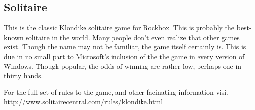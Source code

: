 \subsection{Solitaire}

This is the classic Klondike solitaire game for Rockbox.
This is probably the best-known solitaire in the world. Many people 
don't even realize that other games exist. Though the name may not 
be familiar, the game itself certainly is. This is due in no small 
part to Microsoft's inclusion of the the game in every version of 
Windows. Though popular, the odds of winning are rather low, perhaps 
one in thirty hands.

For the full set of rules to the game, and other facinating information
visit\\
\url{http://www.solitairecentral.com/rules/klondike.html}

